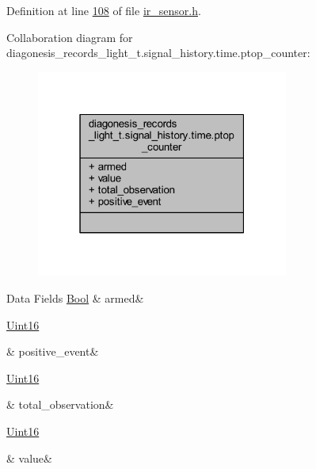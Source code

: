 Definition at line \hyperlink{a00017_source_l00108}{108} of file \hyperlink{a00017_source}{ir\+\_\+sensor.\+h}.



Collaboration diagram for diagonesis\+\_\+records\+\_\+light\+\_\+t.\+signal\+\_\+history.\+time.\+ptop\+\_\+counter\+:\nopagebreak
\begin{figure}[H]
\begin{center}
\leavevmode
\includegraphics[width=235pt]{d8/d38/a00926}
\end{center}
\end{figure}
\begin{DoxyFields}{Data Fields}
\hypertarget{a00017_a6e0c631e86ef2402cfa1ca3608a5123e}{\hyperlink{a00072_a253b248072cfc8bd812c69acd0046eed}{Bool}}\label{a00017_a6e0c631e86ef2402cfa1ca3608a5123e}
&
armed&
\\
\hline

\hypertarget{a00017_adbe1997e7299ac5c071335ca91579447}{\hyperlink{a00072_a59a9f6be4562c327cbfb4f7e8e18f08b}{Uint16}}\label{a00017_adbe1997e7299ac5c071335ca91579447}
&
positive\+\_\+event&
\\
\hline

\hypertarget{a00017_a5c752d693b04fadbacceeaffb3adf49a}{\hyperlink{a00072_a59a9f6be4562c327cbfb4f7e8e18f08b}{Uint16}}\label{a00017_a5c752d693b04fadbacceeaffb3adf49a}
&
total\+\_\+observation&
\\
\hline

\hypertarget{a00017_a2063c1608d6e0baf80249c42e2be5804}{\hyperlink{a00072_a59a9f6be4562c327cbfb4f7e8e18f08b}{Uint16}}\label{a00017_a2063c1608d6e0baf80249c42e2be5804}
&
value&
\\
\hline

\end{DoxyFields}
\label{dd/df5/a00386}
\hypertarget{a00017_dd/df5/a00386}{}
